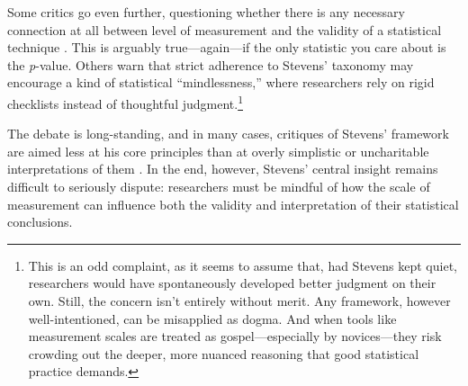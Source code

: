 Some critics go even further, questioning whether there is any necessary connection at all between level of measurement and the validity of a statistical technique \parencite{Gaito1980}. This is arguably true—again—if the only statistic you care about is the \textit{p}-value. Others warn that strict adherence to Stevens’ taxonomy may encourage a kind of statistical ``mindlessness,'' where researchers rely on rigid checklists instead of thoughtful judgment.\footnote{This is an odd complaint, as it seems to assume that, had Stevens kept quiet, researchers would have spontaneously developed better judgment on their own. Still, the concern isn’t entirely without merit. Any framework, however well-intentioned, can be misapplied as dogma. And when tools like measurement scales are treated as gospel—especially by novices—they risk crowding out the deeper, more nuanced reasoning that good statistical practice demands.}

The debate is long-standing, and in many cases, critiques of Stevens’ framework are aimed less at his core principles than at overly simplistic or uncharitable interpretations of them \parencite[see][for a summary]{ZandScholten2009}. In the end, however, Stevens’ central insight remains difficult to seriously dispute: researchers must be mindful of how the scale of measurement can influence both the validity and interpretation of their statistical conclusions.


